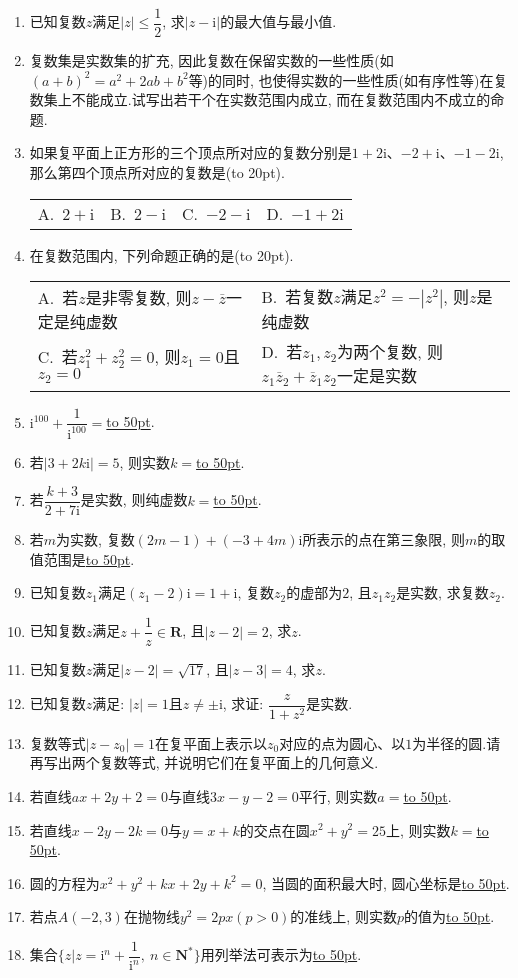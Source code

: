 \documentclass[10pt,a4paper]{article}
\newcommand{\blank}[1]{\underline{\hbox to #1pt{}}}
\newcommand{\bracket}[1]{(\hbox to #1pt{})}
\newcommand{\twoch}[4]{\par\begin{tabular}{p{.46\textwidth}p{.46\textwidth}}
A.~#1& B.~#2\\
C.~#3& D.~#4
\end{tabular}}
\newcommand{\fourch}[4]{\par\begin{tabular}{p{.23\textwidth}p{.23\textwidth}p{.23\textwidth}p{.23\textwidth}}
A.~#1 &B.~#2& C.~#3& D.~#4
\end{tabular}}
\begin{document}
\begin{enumerate}[1.]
\item 已知复数$z$满足$|z|\le \dfrac 12$, 求$|z-\mathrm{i}|$的最大值与最小值.
\item 复数集是实数集的扩充, 因此复数在保留实数的一些性质(如$(a+b)^2=a^2+2ab+b^2$等)的同时, 也使得实数的一些性质(如有序性等)在复数集上不能成立.试写出若干个在实数范围内成立, 而在复数范围内不成立的命题.
\item 如果复平面上正方形的三个顶点所对应的复数分别是$1+2\mathrm{i}$、$-2+\mathrm{i}$、$-1-2\mathrm{i}$, 那么第四个顶点所对应的复数是\bracket{20}.
\fourch{$2+\mathrm{i}$}{$2-\mathrm{i}$}{$-2-\mathrm{i}$}{$-1+2\mathrm{i}$}
\item 在复数范围内, 下列命题正确的是\bracket{20}.
\twoch{若$z$是非零复数, 则$z-\overline z$一定是纯虚数}{若复数$z$满足$z^2=-|z^2|$, 则$z$是纯虚数}{若$z_1^2+z_2^2=0$, 则$z_1=0$且$z_2=0$}{若$z_1,z_2$为两个复数, 则$z_1\overline  z_2+\overline  z_1z_2$一定是实数}
\item $\mathrm{i}^{100}+\dfrac 1{\mathrm{i}^{100}}=$\blank{50}.
\item 若$|3+2k\mathrm{i}|=5$, 则实数$k=$\blank{50}.
\item 若$\dfrac{k+3}{2+7\mathrm{i}}$是实数, 则纯虚数$k=$\blank{50}.
\item 若$m$为实数, 复数$(2m-1)+(-3+4m)\mathrm{i}$所表示的点在第三象限, 则$m$的取值范围是\blank{50}.
\item 已知复数$z_1$满足$(z_1-2)\mathrm{i}=1+\mathrm{i}$, 复数$z_2$的虚部为$2$, 且$z_1z_2$是实数, 求复数$z_2$.
\item 已知复数$z$满足$z+\dfrac 1z\in \mathbf{R}$, 且$|z-2|=2$, 求$z$.
\item 已知复数$z$满足$|z-2|=\sqrt {17}$, 且$|z-3|=4$, 求$z$.
\item 已知复数$z$满足: $|z|=1$且$z\ne \pm \mathrm{i}$, 求证: $\dfrac z{1+z^2}$是实数.
\item 复数等式$|z-z_0|=1$在复平面上表示以$z_0$对应的点为圆心、以$1$为半径的圆.请再写出两个复数等式, 并说明它们在复平面上的几何意义.
\item 若直线$ax+2y+2=0$与直线$3x-y-2=0$平行, 则实数$a=$\blank{50}.
\item 若直线$x-2y-2k=0$与$y=x+k$的交点在圆$x^2+y^2=25$上, 则实数$k=$\blank{50}.
\item 圆的方程为$x^2+y^2+kx+2y+k^2=0$, 当圆的面积最大时, 圆心坐标是\blank{50}.
\item 若点$A(-2,3)$在抛物线$y^2=2px(p>0)$的准线上, 则实数$p$的值为\blank{50}.
\item 集合$\{z|z=\mathrm{i}^n+\dfrac 1{\mathrm{i}^n}, \ n\in \mathbf{N}^*\}$用列举法可表示为\blank{50}.

\end{enumerate}
\end{document}
